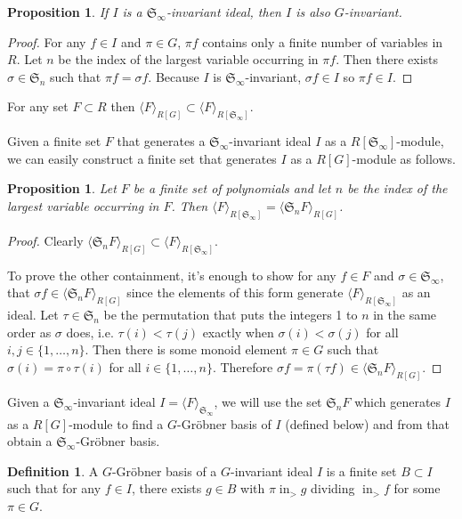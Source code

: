 \documentclass{amsart}
\newtheorem{proposition}[theorem]{Proposition}
\theoremstyle{definition}
\newtheorem{definition}[theorem]{Definition}
\theoremstyle{remark}
\numberwithin{equation}{section}
\newcommand{\<}{\langle}
\renewcommand{\>}{\rangle}
\newcommand{\ideal}[1]{\langle #1 \rangle}
\newcommand{\LT}{\operatorname{in}_>}
\begin{document}
\begin{proposition}
 If $I$ is a ${\mathfrak S}_\infty$-invariant ideal, then $I$ is also $G$-invariant.
\end{proposition}
\begin{proof}
 For any $f \in I$ and $\pi \in G$, $\pi f$ contains only a finite number of variables in $R$.  Let $n$ be the index of the largest variable occurring in $\pi f$.  Then there exists $\sigma \in {\mathfrak S}_n$ such that $\pi f = \sigma f$.  Because $I$ is ${\mathfrak S}_\infty$-invariant, $\sigma f \in I$ so $\pi f \in I$.
\end{proof}

For any set $F \subset R$ then $\ideal{F}_{R[G]} \subset \ideal{F}_{R[{\mathfrak S}_\infty]}$.

Given a finite set $F$ that generates a ${\mathfrak S}_\infty$-invariant ideal $I$ as a $R[{\mathfrak S}_\infty]$-module, we can easily construct a finite set that generates $I$ as a $R[G]$-module as follows.
\begin{proposition}
 Let $F$ be a finite set of polynomials and let $n$ be the index of the largest variable occurring in $F$.  Then $\ideal{F}_{R[{\mathfrak S}_\infty]} = \ideal{{\mathfrak S}_n F}_{R[G]}$.
\end{proposition}
\begin{proof}
 Clearly $\ideal{{\mathfrak S}_n F}_{R[G]} \subset \ideal{F}_{R[{\mathfrak S}_\infty]}$.

 To prove the other containment, it's enough to show for any $f \in F$ and $\sigma \in {\mathfrak S}_\infty$, that $\sigma f \in \ideal{{\mathfrak S}_n F}_{R[G]}$ since the elements of this form generate $\ideal{F}_{R[{\mathfrak S}_\infty]}$ as an ideal.  Let $\tau \in {\mathfrak S}_n$ be the permutation that puts the integers 1 to $n$ in the same order as $\sigma$ does, i.e. $\tau(i) < \tau(j)$ exactly when $\sigma(i) < \sigma(j)$ for all $i,j \in \{1,\ldots,n\}$.  Then there is some monoid element $\pi \in G$ such that $\sigma(i) = \pi \circ \tau(i)$ for all $i \in \{1,\ldots,n\}$.  Therefore $\sigma f = \pi (\tau f) \in \ideal{{\mathfrak S}_n F}_{R[G]}$.
\end{proof}

Given a ${\mathfrak S}_\infty$-invariant ideal $I = \ideal{F}_{{\mathfrak S}_\infty}$, we will use the set ${\mathfrak S}_n F$ which generates $I$ as a $R[G]$-module to find a $G$-Gr\"obner basis of $I$ (defined below) and from that obtain a ${\mathfrak S}_\infty$-Gr\"obner basis.
\begin{definition}
 A $G$-Gr\"obner basis of a $G$-invariant ideal $I$ is a finite set $B \subset I$ such that for any $f \in I$, there exists $g \in B$ with $\pi \LT{g}$ dividing $\LT{f}$ for some $\pi \in G$.
\end{definition}
\end{document}
